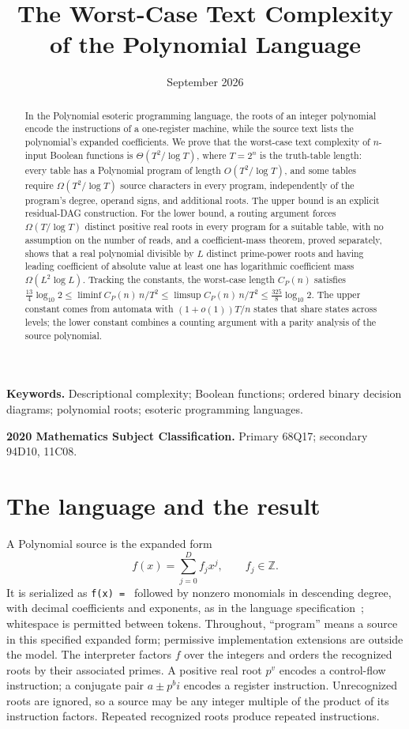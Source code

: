 \documentclass[11pt]{article}
\title{The Worst-Case Text Complexity of the Polynomial Language}
\author{\shortstack{Bangyen Pham\\
\small Independent Researcher\\
\small\href{mailto:bangyenp@gmail.com}{\texttt{bangyenp@gmail.com}}\\
\small\href{https://orcid.org/0009-0006-9928-2088}{ORCID: 0009-0006-9928-2088}}}
\date{September 2026}
\theoremstyle{remark}
\newcommand{\Z}{\mathbb Z}
\begin{document}
\maketitle

\begin{abstract}
In the Polynomial esoteric programming language, the roots of an
integer polynomial encode the instructions of a one-register machine, while
the source text lists the polynomial's expanded coefficients.  We prove that
the worst-case text complexity of $n$-input Boolean functions is
$\Theta(T^2/\log T)$, where $T=2^n$ is the truth-table length: every table
has a Polynomial program of length $O(T^2/\log T)$, and some tables require
$\Omega(T^2/\log T)$ source characters in every program, independently of the
program's degree, operand signs, and additional roots.  The upper bound is
an explicit residual-DAG construction.  For the lower bound, a routing
argument forces $\Omega(T/\log T)$ distinct positive real roots in every
program for a suitable table, with no assumption on the number of reads, and
a coefficient-mass theorem, proved separately, shows that a real polynomial
divisible by $L$ distinct prime-power roots and having leading coefficient
of absolute value at least one has logarithmic coefficient mass
$\Omega(L^2\log L)$.  Tracking the constants, the worst-case length $C_P(n)$
satisfies
$\tfrac{13}4\log_{10}2\le\liminf C_P(n)\,n/T^2\le\limsup C_P(n)\,n/T^2\le\tfrac{325}8\log_{10}2$.
The upper constant comes from automata with $(1+o(1))T/n$ states that share
states across levels; the lower constant combines a counting argument with a
parity analysis of the source polynomial.
\end{abstract}

\noindent\textbf{Keywords.} Descriptional complexity; Boolean functions;
ordered binary decision diagrams; polynomial roots; esoteric programming
languages.

\noindent\textbf{2020 Mathematics Subject Classification.} Primary 68Q17;
secondary 94D10, 11C08.

\section{The language and the result}\label{sec:model}

A Polynomial source is the expanded form
\[
  f(x)=\sum_{j=0}^{D} f_jx^j,\qquad f_j\in\Z.
\]
It is serialized as \texttt{f(x) = } followed by nonzero monomials in
descending degree, with decimal coefficients and exponents, as in the
language specification~\cite{polynomial-spec}; whitespace is permitted
between tokens.  Throughout, ``program'' means a source in this specified
expanded form; permissive implementation extensions are outside the model.
The interpreter factors $f$ over the integers and orders the recognized
roots by their associated primes.  A positive real root $p^v$ encodes a
control-flow instruction; a conjugate pair $a\pm p^b i$ encodes a register
instruction.  Unrecognized roots are ignored, so a source may be any integer
multiple of the product of its instruction factors.  Repeated recognized
roots produce repeated instructions.
\end{document}
